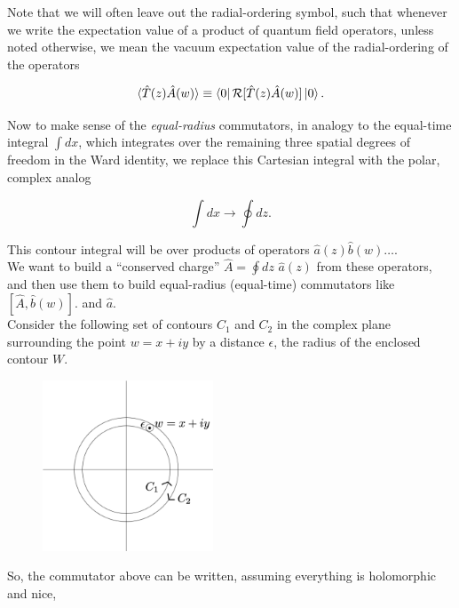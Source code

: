 \noindent Note that we will often leave out the radial-ordering symbol, such that whenever we write the expectation value of a product of quantum field operators, unless noted otherwise, we mean the vacuum expectation value of the radial-ordering of the operators

\begin{equation}
\langle \hat{T} (z) \hat{A} (w) \rangle \equiv \bra{0} \mathcal{R} [ \hat{T} (z) \hat{A} (w) ] \ket{0}.
\end{equation}

\noindent Now to make sense of the \textit{equal-radius} commutators, in analogy to the equal-time integral $\int dx$, which integrates over the remaining three spatial degrees of freedom in the Ward identity, we replace this Cartesian integral with the polar, complex analog

\begin{equation}
\int dx \rightarrow \oint dz.
\end{equation}

\noindent This contour integral will be over products of operators $\hat{a} (z) \hat{b} (w) \dots$. \\

\noindent We want to build a ``conserved charge'' $\hat{A} = \oint dz \,\, \hat{a} (z)$ from these operators, and then use them to build equal-radius (equal-time) commutators like $[\hat{A}, \hat{b} (w) ]$. and $\hat{a}$. \\

\noindent Consider the following set of contours $C_1$ and $C_2$ in the complex plane surrounding the point $w=x+iy$ by a distance $\epsilon$, the radius of the enclosed contour $W$.

\begin{figure}[H]
	\centering
	\includegraphics[width=2in]{images/radial_quant_contour.png} 
\end{figure} 

\noindent So, the commutator above can be written, assuming everything is holomorphic and nice,

